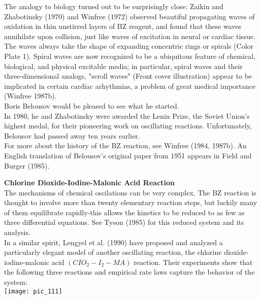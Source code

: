 \documentclass{article}
\newcommand\tab[1][1cm]{\hspace*{#1}}
\begin{document}
The analogy to biology turned out to be surprisingly close: Zaikin and Zhabotinsky (1970) and Winfree (1972) observed beautiful propagating waves of oxidation in thin unstirred layers of BZ reagent, and found that these waves annihilate upon collision, just like waves of excitation in neural or cardiac tissue. The waves always take the shape of expanding concentric rings or spirals (Color Plate 1). Spiral waves are now recognized to be a ubiquitous feature of chemical, biological, and physical excitable media; in particular, spiral waves and their three-dimensional analogs, "scroll waves" (Front cover illustration) appear to be implicated in certain cardiac arhythmias, a problem of great medical importance (Winfree 1987b). \\ \tab
Boris Belousov would be pleased to see what he started. \\ \tab
In 1980, he and Zhabotinsky were awarded the Lenin Prize, the Soviet Union's highest medal, for their pioneering work on oscillating reactions. Unfortunately, Belousov had passed away ten years earlier. \\ \tab
For more about the history of the BZ reaction, see Winfree (1984, 1987b). An English translation of Belousov's original paper from 1951 appears in Field and Burger (1985). 

\textbf {Chlorine Dioxide-Iodine-Malonic Acid Reaction} \\ \tab
The mechanisms of chemical oscilations can be very complex. The BZ reaction is thought to involve more than twenty elementary reaction steps, but luckily many of them equilibrate rapidly-this allows the kinetics to be reduced to as few as three differential equations. See Tyson (1985) for this reduced system and its analysis. \\ \tab
In a similar spirit, Lengyel et al. (1990) have proposed and analyzed a particularly elegant model of another oscillating reaction, the chlorine dioxide-iodine-malonic acid $(CIO_{2}-I_{2}-MA)$ reaction. Their experiments show that the following three reactions and empirical rate laws capture the behavior of the system: 
\\
\texttt{[image: pic\_111]}
\end{document}
